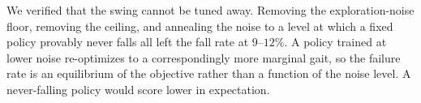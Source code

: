 We verified that the swing cannot be tuned away. Removing the
exploration-noise floor, removing the ceiling, and annealing the noise to a
level at which a fixed policy provably never falls all left the fall rate at
$9$--$12\%$. A policy trained at lower noise re-optimizes to a correspondingly
more marginal gait, so the failure rate is an equilibrium of the objective
rather than a function of the noise level. A never-falling policy would score
lower in expectation.
